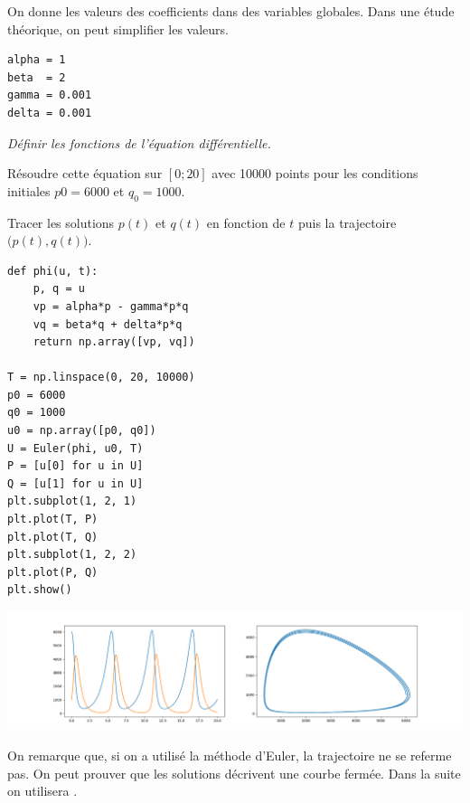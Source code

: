 On donne les valeurs des coefficients dans des variables globales. Dans une étude théorique, on peut simplifier les valeurs.
\begin{lstlisting}
alpha = 1
beta  = 2
gamma = 0.001
delta = 0.001
\end{lstlisting}
\begin{Exercise}\it
Définir les fonctions de l'équation différentielle.

Résoudre cette équation sur $[0; 20]$ avec 10000 points pour les conditions initiales $p0= 6000$ et $q_0 = 1000$.

Tracer les solutions $p(t)$ et $q(t)$ en fonction de $t$ puis la trajectoire $\bigl(p(t), q(t)\bigr)$.
\end{Exercise}
\begin{Answer}
\begin{lstlisting}
def phi(u, t):
    p, q = u
    vp = alpha*p - gamma*p*q
    vq = beta*q + delta*p*q
    return np.array([vp, vq])

T = np.linspace(0, 20, 10000)
p0 = 6000
q0 = 1000
u0 = np.array([p0, q0])
U = Euler(phi, u0, T)
P = [u[0] for u in U]
Q = [u[1] for u in U]
plt.subplot(1, 2, 1)
plt.plot(T, P)
plt.plot(T, Q)
plt.subplot(1, 2, 2)
plt.plot(P, Q)
plt.show()
\end{lstlisting}
\begin{center}
\includegraphics[width=14cm]{TP/Images/ED2_proies1.png}
\end{center}
\end{Answer}
On remarque que, si on a utilisé la méthode d'Euler, la trajectoire ne se referme pas. On peut prouver que les solutions décrivent une courbe fermée. Dans la suite on utilisera .
